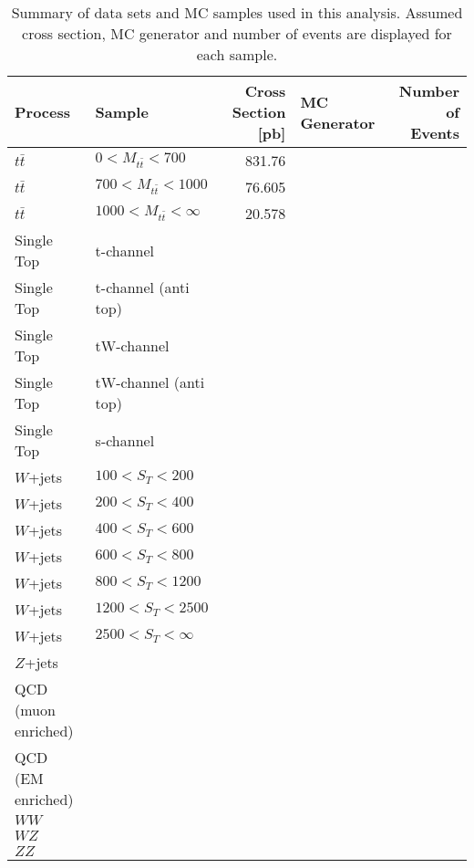 	\begin{landscape}
	\begin{table}
	\centering
	 \begin{tabular}{|l|l|r|l|r|}
	 	\hline
	 	Process & Sample & Cross Section [pb] & MC Generator & Number of Events \\
	 	\hline
	 	$t\bar{t}$ & $0 < M_{t\bar{t}} < 700$ & 831.76 & & \\
	 	$t\bar{t}$ & $700 < M_{t\bar{t}} < 1000$ & 76.605 & & \\
	 	$t\bar{t}$ & $1000 < M_{t\bar{t}} < \infty$ & 20.578 & & \\
	 	\hline
		Single Top &t-channel  & & & \\
		Single Top & t-channel (anti top) & & & \\
		Single Top & tW-channel & & & \\
		Single Top & tW-channel (anti top) & & & \\
		Single Top & s-channel & & & \\
		$W$+jets & $100 < S_T < 200$ & & & \\
	 	$W$+jets & $200 < S_T < 400$ & & & \\
	 	$W$+jets & $400 < S_T < 600$ & & & \\
	 	$W$+jets & $600 < S_T < 800$ & & & \\
	 	$W$+jets & $800 < S_T < 1200$ & & & \\
	 	$W$+jets & $1200 < S_T < 2500$ & & & \\
	 	$W$+jets & $2500 < S_T < \infty$ & & & \\
	 	$Z$+jets & & & & \\
	 	QCD (muon enriched) & & & & \\
	 	QCD (EM enriched) & & & & \\
	 	$WW$& & & & \\
	 	$WZ$& & & & \\
	 	$ZZ$& & & & \\
	 	 \hline
	 \end{tabular}
	\caption{Summary of data sets and MC samples used in this analysis. Assumed cross section, MC generator and number of events are displayed for each sample.}
	\label{MC_Tab}	
	\end{table}
	\end{landscape}
	
	
